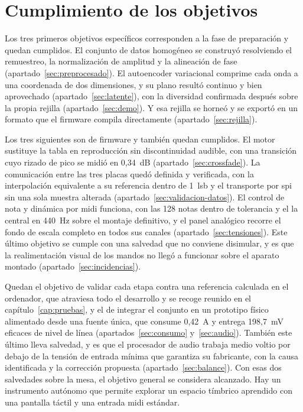 \section{Cumplimiento de los objetivos}
\hypertarget{RE3.1}{}\label{RE3.1}

Los tres primeros objetivos específicos corresponden a la fase de preparación y
quedan cumplidos. El conjunto de datos homogéneo se construyó resolviendo el
remuestreo, la normalización de amplitud y la alineación de fase
(apartado~\ref{sec:preprocesado}). El autoencoder variacional comprime cada onda
a una coordenada de dos dimensiones, y su plano resultó continuo y bien
aprovechado (apartado~\ref{sec:latente}), con la diversidad confirmada después
sobre la propia rejilla (apartado~\ref{sec:demo}). Y esa rejilla se horneó y se
exportó en un formato que el firmware compila directamente
(apartado~\ref{sec:rejilla}).

Los tres siguientes son de firmware y también quedan cumplidos. El motor
sustituye la tabla en reproducción sin discontinuidad audible, con una
transición cuyo rizado de pico se midió en 0,34~dB
(apartado~\ref{sec:crossfade}). La comunicación entre las tres placas quedó
definida y verificada, con la interpolación equivalente a su referencia dentro
de 1~\gls{lsb} y el transporte por \gls{spi} sin una sola muestra alterada
(apartado~\ref{sec:validacion-datos}). El control de nota y dinámica por
\gls{midi} funciona, con las 128 notas dentro de tolerancia y el la central en
440~Hz sobre el montaje definitivo, y el panel analógico recorre el fondo de
escala completo en todos sus canales (apartado~\ref{sec:tensiones}). Este último
objetivo se cumple con una salvedad que no conviene disimular, y es que la
realimentación visual de los mandos no llegó a funcionar sobre el aparato
montado (apartado~\ref{sec:incidencias}).

Quedan el objetivo de validar cada etapa contra una referencia calculada en el
ordenador, que atraviesa todo el desarrollo y se recoge reunido en el
capítulo~\ref{cap:pruebas}, y el de integrar el conjunto en un prototipo físico
alimentado desde una fuente única, que consume 0,42~A y entrega 198,7~mV
eficaces de nivel de línea (apartados~\ref{sec:consumo} y~\ref{sec:audio}).
También este último lleva salvedad, y es que el procesador de audio trabaja
medio voltio por debajo de la tensión de entrada mínima que garantiza su
fabricante, con la causa identificada y la corrección propuesta
(apartado~\ref{sec:balance}). Con esas dos salvedades sobre la mesa, el objetivo
general se considera alcanzado. Hay un instrumento autónomo que permite explorar
un espacio tímbrico aprendido con una pantalla táctil y una entrada \gls{midi}
estándar.

